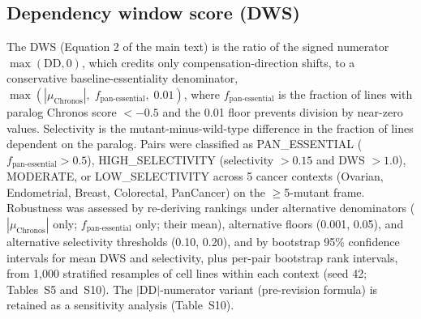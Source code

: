 \documentclass[11pt,a4paper]{article}
\begin{document}
\subsection{Dependency window score (DWS)}
The DWS (Equation 2 of the main text) is the ratio of the signed numerator $\max(\mathrm{DD},0)$, which credits only compensation-direction shifts, to a conservative baseline-essentiality denominator, $\max(|\mu_{\text{Chronos}}|,\;f_{\text{pan-essential}},\;0.01)$, where $f_{\text{pan-essential}}$ is the fraction of lines with paralog Chronos score $<-0.5$ and the 0.01 floor prevents division by near-zero values. Selectivity is the mutant-minus-wild-type difference in the fraction of lines dependent on the paralog. Pairs were classified as PAN\_ESSENTIAL ($f_{\text{pan-essential}}>0.5$), HIGH\_SELECTIVITY (selectivity $>0.15$ and DWS $>1.0$), MODERATE, or LOW\_SELECTIVITY across 5 cancer contexts (Ovarian, Endometrial, Breast, Colorectal, PanCancer) on the $\ge$5-mutant frame. Robustness was assessed by re-deriving rankings under alternative denominators ($|\mu_{\text{Chronos}}|$ only; $f_{\text{pan-essential}}$ only; their mean), alternative floors (0.001, 0.05), and alternative selectivity thresholds (0.10, 0.20), and by bootstrap 95\% confidence intervals for mean DWS and selectivity, plus per-pair bootstrap rank intervals, from 1{,}000 stratified resamples of cell lines within each context (seed 42; Tables~S5 and~S10). The $|$DD$|$-numerator variant (pre-revision formula) is retained as a sensitivity analysis (Table~S10).
\end{document}
